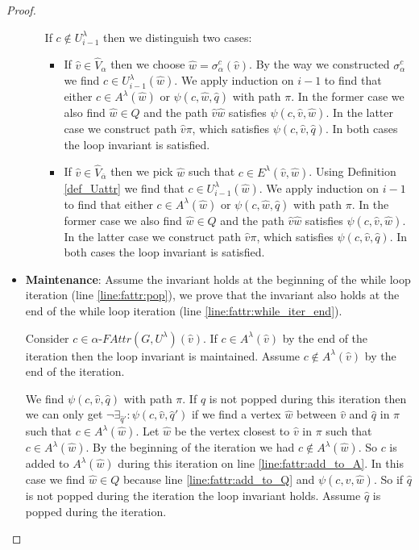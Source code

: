 \begin{theorem}
\begin{proof}
\begin{itemize}[\ \ ]
\begin{itemize}[\ \ ]
				If $c \notin U^\lambda_{i-1}$ then we distinguish two cases:
				\begin{itemize}
					\item If $\hat{v} \in \hat{V}_\alpha$ then we choose $\hat{w} = \sigma_\alpha^c(\hat{v})$. By the way we constructed $\sigma_\alpha^c$ we find $c \in U^\lambda_{i-1}(\hat{w})$. We apply induction on ${i-1}$ to find that either $c \in A^\lambda(\hat{w})$ or $\psi(c,\hat{w},\hat{q})$ with path $\pi$. In the former case we also find $\hat{w} \in Q$ and the path $\hat{v}\hat{w}$ satisfies $\psi(c,\hat{v},\hat{w})$. In the latter case we construct path $\hat{v}\pi$, which satisfies $\psi(c,\hat{v},\hat{q})$. In both cases the loop invariant is satisfied.
					\item If $\hat{v} \in \hat{V}_{\overline{\alpha}}$ then we pick $\hat{w}$ such that $c \in E^\lambda(\hat{v},\hat{w})$. Using Definition \ref{def_Uattr} we find that $c \in U^\lambda_{i-1}(\hat{w})$. We apply induction on ${i-1}$ to find that either $c \in A^\lambda(\hat{w})$ or $\psi(c,\hat{w},\hat{q})$ with path $\pi$. In the former case we also find $\hat{w} \in Q$ and the path $\hat{v}\hat{w}$ satisfies $\psi(c,\hat{v},\hat{w})$. In the latter case we construct path $\hat{v}\pi$, which satisfies $\psi(c,\hat{v},\hat{q})$. In both cases the loop invariant is satisfied.
				\end{itemize}
			\end{itemize}
			
			
			\item \textbf{Maintenance}: Assume the invariant holds at the beginning of the while loop iteration (line \ref{line:fattr:pop}), we prove that the invariant also holds at the end of the while loop iteration (line \ref{line:fattr:while_iter_end}).
			
			Consider $c \in \alpha\textit{-FAttr}(G,U^\lambda)(\hat{v})$. If $c \in A^\lambda(\hat{v})$ by the end of the iteration then the loop invariant is maintained. Assume $c \notin A^\lambda(\hat{v})$ by the end of the iteration.
			
			We find $\psi(c,\hat{v},\hat{q})$ with path $\pi$. If $\hat{q}$ is not popped during this iteration then we can only get $\neg\exists_{\hat{q}'}:\psi(c,\hat{v},\hat{q}')$ if we find a vertex $\hat{w}$ between $\hat{v}$ and $\hat{q}$ in $\pi$ such that $c \in A^\lambda(\hat{w})$. Let $\hat{w}$ be the vertex closest to $\hat{v}$ in $\pi$ such that $c \in A^\lambda(\hat{w})$. By the beginning of the iteration we had $c \notin A^\lambda(\hat{w})$. So $c$ is added to $A^\lambda(\hat{w})$ during this iteration on line \ref{line:fattr:add_to_A}. In this case we find $\hat{w} \in Q$ because line \ref{line:fattr:add_to_Q} and $\psi(c,\hat{v},\hat{w})$. So if $\hat{q}$ is not popped during the iteration the loop invariant holds. Assume $\hat{q}$ is popped during the iteration.
			

\end{itemize}
\end{proof}
\end{theorem}
